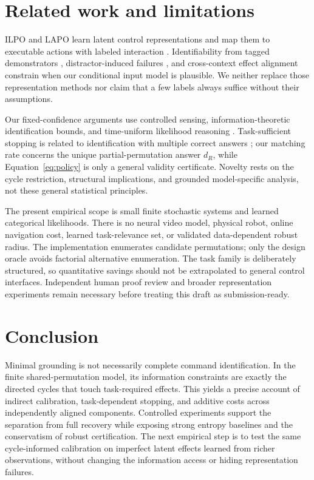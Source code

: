\documentclass{article}
\begin{document}
\section{Related work and limitations}
ILPO and LAPO learn latent control representations and map them to executable actions with labeled interaction \citep{edwards2019,schmidt2023}. Identifiability from tagged demonstrators \citep{schur2026}, distractor-induced failures \citep{nikulin2025}, and cross-context effect alignment \citep{jiang2026} constrain when our conditional input model is plausible. We neither replace those representation methods nor claim that a few labels always suffice without their assumptions.

Our fixed-confidence arguments use controlled sensing, information-theoretic identification bounds, and time-uniform likelihood reasoning \citep{nitinawarat2012,kaufmann2016,garivier2016,howard2018}. Task-sufficient stopping is related to identification with multiple correct answers \citep{degenne2019}; our matching rate concerns the unique partial-permutation answer $d_R$, while Equation~\eqref{eq:policy} is only a general validity certificate. Novelty rests on the cycle restriction, structural implications, and grounded model-specific analysis, not these general statistical principles.

The present empirical scope is small finite stochastic systems and learned categorical likelihoods. There is no neural video model, physical robot, online navigation cost, learned task-relevance set, or validated data-dependent robust radius. The implementation enumerates candidate permutations; only the design oracle avoids factorial alternative enumeration. The task family is deliberately structured, so quantitative savings should not be extrapolated to general control interfaces. Independent human proof review and broader representation experiments remain necessary before treating this draft as submission-ready.

\section{Conclusion}
Minimal grounding is not necessarily complete command identification. In the finite shared-permutation model, its information constraints are exactly the directed cycles that touch task-required effects. This yields a precise account of indirect calibration, task-dependent stopping, and additive costs across independently aligned components. Controlled experiments support the separation from full recovery while exposing strong entropy baselines and the conservatism of robust certification. The next empirical step is to test the same cycle-informed calibration on imperfect latent effects learned from richer observations, without changing the information access or hiding representation failures.
\end{document}

